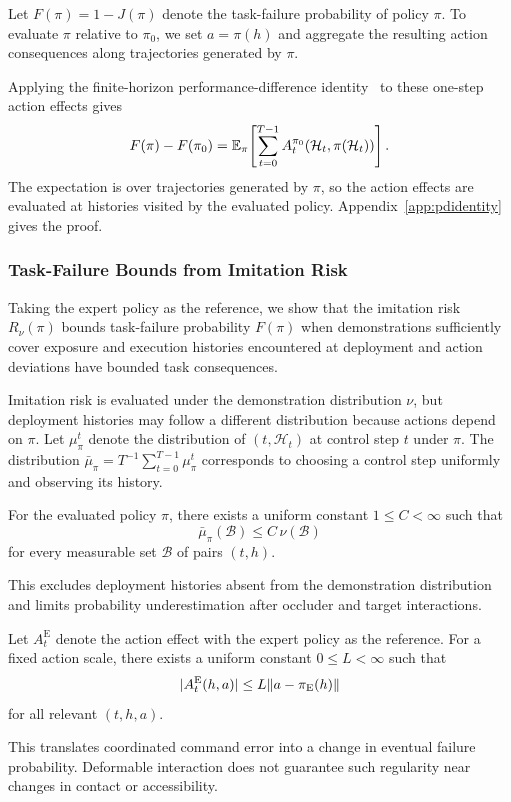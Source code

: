Let $F(\pi)=1-J(\pi)$ denote the task-failure probability of policy $\pi$.
To evaluate $\pi$ relative to $\pi_0$, we set $a=\pi(h)$
and aggregate the resulting action consequences along trajectories generated by $\pi$.

Applying the finite-horizon performance-difference identity~\cite{kakade2002,ross2014aggrevate,cheng2018value}
to these one-step action effects gives
\begin{equation}
 F(\pi)-F(\pi_0)
 =\mathbb E_\pi\!\left[
 \sum_{t=0}^{T-1}A_t^{\pi_0}(\mathcal H_t,\pi(\mathcal H_t))
 \right].
\label{eq:pd}
\end{equation}
The expectation is over trajectories generated by $\pi$, so the action effects are evaluated at histories visited by the evaluated policy.
Appendix~\ref{app:pdidentity} gives the proof.


\subsubsection{Task-Failure Bounds from Imitation Risk}
\label{sec:actionerrorbound}
Taking the expert policy as the reference,
we show that the imitation risk $R_\nu(\pi)$ bounds task-failure probability $F(\pi)$
when demonstrations sufficiently cover exposure and execution histories encountered at deployment
and action deviations have bounded task consequences.

Imitation risk is evaluated under the demonstration distribution $\nu$,
but deployment histories may follow a different distribution because actions depend on $\pi$.
Let $\mu_\pi^t$ denote the distribution of $(t,\mathcal H_t)$ at control step $t$ under $\pi$.
The distribution $\bar\mu_\pi=T^{-1}\sum_{t=0}^{T-1}\mu_\pi^t$ corresponds to choosing
a control step uniformly and observing its history.

\begin{assumption}
\label{ass:democoverage}

For the evaluated policy $\pi$, there exists a uniform constant
$1\le C<\infty$ such that
\[
\bar\mu_\pi(\mathcal B)\le C\,\nu(\mathcal B)
\]
for every measurable set $\mathcal B$ of pairs $(t,h)$.
\end{assumption}
This excludes deployment histories absent from the demonstration distribution and limits probability underestimation after occluder and target interactions.

\begin{assumption}
\label{ass:actionsensitivity}
Let $A_t^{\mathrm E}$ denote the action effect with the expert
policy as the reference.
For a fixed action scale, there exists a uniform constant
$0\le L<\infty$ such that
\[
|A_t^{\mathrm E}(h,a)|
\le L\lVert a-\pi_{\mathrm E}(h)\rVert
\]
for all relevant $(t,h,a)$.
\end{assumption}
This translates coordinated command error into a change in eventual failure probability.
Deformable interaction does not guarantee such regularity near changes in contact or accessibility.

